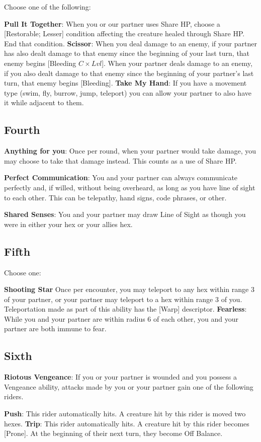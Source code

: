 \begin{multicols*}{2}
Choose one of the following:
\begin{itemize}
\thing \textbf{Pull It Together}: When you or our partner uses Share HP, choose a [Restorable; Lesser] condition affecting the creature healed through Share HP. End that condition.
\thing \textbf{Scissor}: When you deal damage to an enemy, if your partner has also dealt damage to that enemy since the beginning of your last turn, that enemy begins [Bleeding $C\times Lvl$]. When your partner deals damage to an enemy, if you also dealt damage to that enemy since the beginning of your partner's last turn, that enemy begins [Bleeding].
\thing \textbf{Take My Hand}: If you have a movement type (swim, fly, burrow, jump, teleport) you can allow your partner to also have it while adjacent to them.
\end{itemize}

\subsection*{Fourth \Facet}
\textbf{Anything for you}: Once per round, when your partner would take damage, you may choose to take that damage instead. This counts as a use of Share HP.

\textbf{Perfect Communication}: You and your partner can always communicate perfectly and, if willed, without being overheard, as long as you have line of sight to each other. This can be telepathy, hand signs, code phrases, or other.

\textbf{Shared Senses}: You and your partner may draw Line of Sight as though you were in either your hex or your allies hex.

\subsection*{Fifth \Facet}
Choose one:
\begin{itemize}
\thing \textbf{Shooting Star} Once per encounter, you may teleport to any hex within range 3 of your partner, or your partner may teleport to a hex within range 3 of you. Teleportation made as part of this ability has the [Warp] descriptor.
\thing \textbf{Fearless}: While you and your partner are within radius 6 of each other, you and your partner are both immune to fear.
\end{itemize}

\subsection*{Sixth \Facet}
\textbf{Riotous Vengeance}: If you or your partner is wounded and you possess a Vengeance ability, attacks made by you or your partner gain one of the following riders.
\begin{itemize}
\thing \textbf{Push}: This rider automatically hits. A creature hit by this rider is moved two hexes.
\thing \textbf{Trip}: This rider automatically hits. A creature hit by this rider becomes [Prone]. At the beginning of their next turn, they become Off Balance.
\end{itemize}


\end{multicols*}
